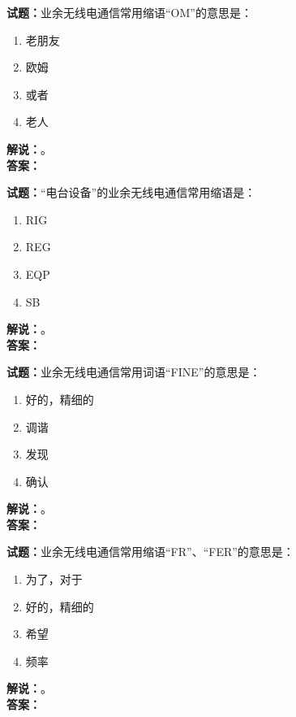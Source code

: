 \documentclass{ctexbook}
\begin{document}
\vspace{\baselineskip}

\noindent\textbf{试题：}业余无线电通信常用缩语“OM”的意思是：
\begin{enumerate}[leftmargin=3em]
  \item 老朋友
  \item 欧姆
  \item 或者
  \item 老人
\end{enumerate}
\noindent\textbf{解说：}\textbf{}。\\\noindent\textbf{答案：}

\vspace{\baselineskip}

\noindent\textbf{试题：}“电台设备”的业余无线电通信常用缩语是：
\begin{enumerate}[leftmargin=3em]
  \item RIG
  \item REG
  \item EQP
  \item SB
\end{enumerate}
\noindent\textbf{解说：}\textbf{}。\\\noindent\textbf{答案：}

\vspace{\baselineskip}

\noindent\textbf{试题：}业余无线电通信常用词语“FINE”的意思是：
\begin{enumerate}[leftmargin=3em]
  \item 好的，精细的
  \item 调谐
  \item 发现
  \item 确认
\end{enumerate}
\noindent\textbf{解说：}\textbf{}。\\\noindent\textbf{答案：}

\vspace{\baselineskip}

\noindent\textbf{试题：}业余无线电通信常用缩语“FR”、“FER”的意思是：
\begin{enumerate}[leftmargin=3em]
  \item 为了，对于
  \item 好的，精细的
  \item 希望
  \item 频率
\end{enumerate}
\noindent\textbf{解说：}\textbf{}。\\\noindent\textbf{答案：}
\end{document}
